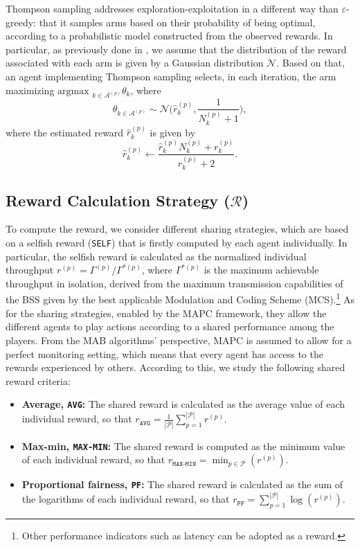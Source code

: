 Thompson sampling addresses exploration-exploitation in a different way than $\varepsilon$-greedy: that it samples arms based on their probability of being optimal, according to a probabilistic model constructed from the observed rewards. In particular, as previously done in \cite{wilhelmi2019potential}, we assume that the distribution of the reward associated with each arm is given by a Gaussian distribution $\mathcal{N}$. Based on that, an agent implementing Thompson sampling selects, in each iteration, the arm maximizing $\text{argmax }_{k\in\mathcal{A}^{(p)}} \theta_k$, where
\begin{equation}
    \theta_{k\in\mathcal{A}^{(p)}}\sim \mathcal{N}\bigg(\hat{r}_{k}^{(p)}, \frac{1}{N_k^{(p)} + 1}\bigg),
\end{equation}
where the estimated reward $\hat{r}_{k}^{(p)}$ is given by
\begin{equation}
    \hat{r}_{k}^{(p)} \leftarrow \frac{\hat{r}_{k}^{(p)}  N^{(p)}_{k} + r^{(p)}_{k}}{r^{(p)}_{k} + 2}.
\end{equation}

\subsection{Reward Calculation Strategy ($\mathcal{R}$)}
\label{sec:reward_calculation}

To compute the reward, we consider different sharing strategies, which are based on a selfish reward (\texttt{SELF}) that is firstly computed by each agent individually. In particular, the selfish reward is calculated as the normalized individual throughput $r^{(p)}=\Gamma^{(p)}/\Gamma^{*(p)}$, where $\Gamma^{*(p)}$ is the maximum achievable throughput in isolation, derived from the maximum transmission capabilities of the BSS given by the best applicable Modulation and Coding Scheme (MCS).\footnote{Other performance indicators such as latency can be adopted as a reward.} As for the sharing strategies, enabled by the MAPC framework, they allow the different agents to play actions according to a shared performance among the players. From the MAB algorithms' perspective, MAPC is assumed to allow for a perfect monitoring setting, which means that every agent has access to the rewards experienced by others. According to this, we study the following shared reward criteria:
\begin{itemize}
    \item \textbf{Average, \texttt{AVG}:} The shared reward is calculated as the average value of each individual reward, so that $r_\texttt{AVG} = \frac{1}{|\mathcal{P}|}\sum_{p=1}^{|\mathcal{P}|} r^{(p)}$.
    \item \textbf{Max-min, \texttt{MAX-MIN}:} The shared reward is computed as the minimum value of each individual reward, so that $r_\texttt{MAX-MIN} = \min_{p\in \mathcal{P}} (r^{(p)})$.
    \item \textbf{Proportional fairness, \texttt{PF}:} The shared reward is calculated as the sum of the logarithms of each individual reward, so that $r_\texttt{PF} = \sum_{p=1}^{|\mathcal{P}|} \log(r^{(p)})$.
\end{itemize}

